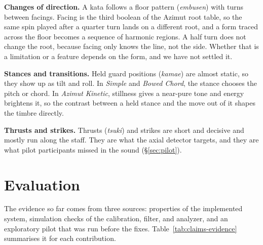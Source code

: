 \documentclass[sigconf,nonacm]{acmart}
\newcommand{\preset}[1]{\textit{#1}}
\begin{document}
\textbf{Changes of direction.} A kata follows a floor pattern (\emph{embusen}) with turns between
facings. Facing is the third boolean of the Azimut root table, so the same spin played after a
quarter turn lands on a different root, and a form traced across the floor becomes a sequence of
harmonic regions. A half turn does not change the root, because facing only knows the line, not the
side. Whether that is a limitation or a feature depends on the form, and we have not settled it.

\textbf{Stances and transitions.} Held guard positions (\emph{kamae}) are almost static, so they
show up as tilt and roll. In \preset{Simple} and \preset{Bowed Chord}, the stance chooses the pitch
or chord. In \preset{Azimut Kinetic}, stillness gives a near-pure tone and energy brightens it, so
the contrast between a held stance and the move out of it shapes the timbre directly.

\textbf{Thrusts and strikes.} Thrusts (\emph{tsuki}) and strikes are short and decisive and mostly
run along the staff. They are what the axial detector targets, and they are what pilot participants
missed in the sound (\S\ref{sec:pilot}).

\section{Evaluation}
\label{sec:evaluation}
The evidence so far comes from three sources: properties of the implemented system, simulation
checks of the calibration, filter, and analyzer, and an exploratory pilot that was run before the
fixes. Table~\ref{tab:claims-evidence} summarises it for each contribution.
\end{document}
